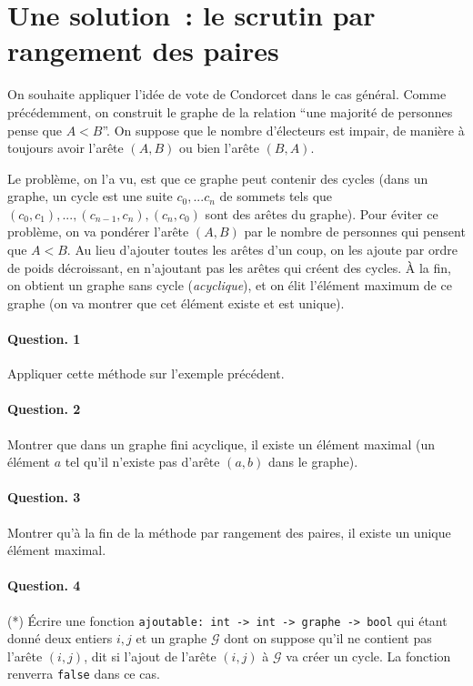 \documentclass[10pt,a4paper]{article}
\begin{document}
\section{Une solution~: le scrutin par rangement des paires}
On souhaite appliquer l'idée de vote de Condorcet dans le cas général.
Comme précédemment, on construit le graphe de la relation ``une majorité de 
personnes pense que $A<B$''. On suppose que 
le nombre d'électeurs est impair, de manière à toujours avoir l'arête 
$(A,B)$ ou bien l'arête $(B,A)$.

Le problème, on l'a vu, est que ce graphe peut contenir des cycles (dans un 
graphe, un cycle est une suite $c_0,... c_n$ de sommets tels que $(c_0,c_1),...,
(c_{n-1},c_n), (c_n,c_0)$ sont des arêtes du graphe). Pour éviter ce problème, 
on va pondérer l'arête $(A,B)$ par le nombre de personnes qui pensent que $A<B$.
Au lieu d'ajouter toutes les arêtes d'un coup, on les 
ajoute par ordre de poids décroissant, en n'ajoutant pas les 
arêtes qui créent des cycles. À la fin, on obtient un graphe sans cycle 
(\textit{acyclique}), et on élit l'élément maximum de ce graphe 
(on va montrer que cet élément existe et est unique).

\paragraph{Question. 1\\}
Appliquer cette méthode sur l'exemple précédent.

\paragraph{Question. 2\\}
Montrer que dans un graphe fini acyclique, il existe un élément 
maximal (un élément $a$ tel qu'il n'existe pas d'arête $(a,b)$ dans le graphe).

\paragraph{Question. 3\\}
Montrer qu'à la fin de la méthode par rangement des paires, il existe un unique 
élément maximal.

\paragraph{Question. 4\\}
(*) Écrire une fonction \texttt{ajoutable: int -> int -> graphe -> bool} qui étant 
donné deux entiers $i,j$ et un graphe $\mathcal{G}$ dont on suppose qu'il ne 
contient pas l'arête $(i,j)$, dit si l'ajout de l'arête $(i,j)$ à $\mathcal{G}$ 
va créer un cycle. La fonction renverra \texttt{false} dans ce cas.
\end{document}
